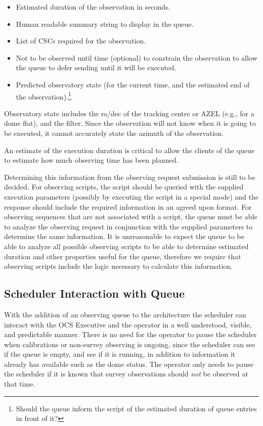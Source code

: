\documentclass[TS,toc,lsstdraft]{lsstdoc}
\begin{document}
\begin{itemize}
  \item Estimated duration of the observation in seconds.
  \item Human readable summary string to display in the queue.
  \item List of CSCs required for the observation.
  \item Not to be observed until time (optional) to constrain the observation to allow the queue to defer sending until it will be executed.
  \item Predicted observatory state (for the current time, and the estimated end of the observation).\footnote{Should the queue inform the script of the estimated duration of queue entries in front of it?}
\end{itemize}

Observatory state includes the ra/dec of the tracking centre or AZEL (e.g., for a dome flat), and the filter.
Since the observation will not know when it is going to be executed, it cannot accurately state the azimuth of the observation.

An estimate of the execution duration is critical to allow the clients of the queue to estimate how much observing time has been planned.

Determining this information from the observing request submission is still to be decided.
For observing scripts, the script should be queried with the supplied execution parameters (possibly by executing the script in a special mode) and the response should include the required information in an agreed upon format.
For observing sequences that are not associated with a script, the queue must be able to analyze the observing request in conjunction with the supplied parameters to determine the same information.
It is unreasonable to expect the queue to be able to analyze all possible observing scripts to be able to determine estimated duration and other properties useful for the queue, therefore we require that observing scripts include the logic necessary to calculate this information.

\subsection{Scheduler Interaction with Queue}

With the addition of an observing queue to the architecture the scheduler can interact with the OCS Executive and the operator in a well understood, visible, and predictable manner.
There is no need for the operator to pause the scheduler when calibrations or non-survey observing is ongoing, since the scheduler can see if the queue is empty, and see if it is running, in addition to information it already has available such as the dome status.
The operator only needs to pause the scheduler if it is known that survey observations should \emph{not} be observed at that time.
\end{document}

